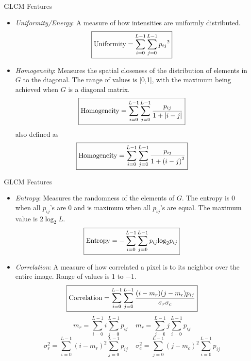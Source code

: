 \begin{frame}{GLCM Features}
\begin{footnotesize}
\begin{itemize}

\item \textit{\color{mycolor1}Uniformity/Energy}: A measure of how intensities are uniformly distributed.
\begin{equation}
\boxed{{\rm Uniformity} = \sum\limits_{i = 0}^{L-1} {\sum\limits_{j = 0}^{L-1} {{p_{ij}}^2} }} \nonumber
\end{equation}
\item \textit{\color{mycolor1}Homogeneity}: Measures the spatial closeness of the distribution of elements in $G$ to the diagonal. The range of values is [0,1], with the maximum being achieved when $G$ is a diagonal matrix.
\begin{equation}
\boxed{{\rm Homogeneity} = \sum\limits_{i = 0}^{L-1} {\sum\limits_{j = 0}^{L-1} {\frac{{{p_{ij}}}}{{1 + \left| {i - j} \right|}}} }}\nonumber
\end{equation}
also defined as
\begin{equation}
\boxed{{\rm Homogeneity} = \sum\limits_{i = 0}^{L-1} {\sum\limits_{j = 0}^{L-1} {\frac{{{p_{ij}}}}{{1 + \left( {i - j} \right)^2}}} }}\nonumber
\end{equation}
\end{itemize}
\end{footnotesize}
\end{frame}


\begin{frame}{GLCM Features}
\begin{footnotesize}
\begin{itemize}
\item \textit{\color{mycolor1}Entropy}: Measures the randomness of the elements of $G$. The entropy is 0 when all $p_{ij}$'s are 0 and is maximum when all $p_{ij}$'s are equal. The maximum value is $2\log_2{L}$.
\begin{equation}
\boxed{{\rm Entropy} = - \sum\limits_{i = 0}^{L-1} {\sum\limits_{j = 0}^{L-1} {{p_{ij}}{{\log }_2}} } {p_{ij}}}\nonumber
\end{equation}
\item \textit{\color{mycolor1}Correlation}: A measure of how correlated a pixel is to its neighbor over the entire image. Range of values is 1 to $-1$.
\begin{equation}
\boxed{{\rm Correlation} = \sum\limits_{i = 0}^{L-1} {\sum\limits_{j = 0}^{L-1} {\frac{(i-m_r)(j-m_c)p_{ij}}{\sigma_r \sigma_c}} }} \nonumber
\end{equation}
\[m_r = \sum\limits_{i = 0}^{L-1} i{\sum\limits_{j = 0}^{L-1} {{p_{ij}}} }~~~~~m_r = \sum\limits_{j = 0}^{L-1} j{\sum\limits_{i = 0}^{L-1} {{p_{ij}}} }\]
\[\sigma^2_r = \sum\limits_{i = 0}^{L-1} (i-m_r)^2{\sum\limits_{j = 0}^{L-1} {{p_{ij}}} }~~~~~\sigma^2_c = \sum\limits_{j = 0}^{L-1} (j-m_c)^2{\sum\limits_{i = 0}^{L-1} {{p_{ij}}} }\]
\end{itemize}
\end{footnotesize}
\end{frame}

